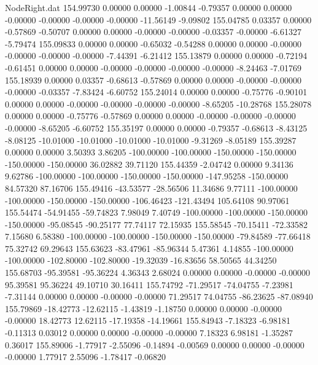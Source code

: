 \begin{filecontents}{NodeRight.dat}
 154.99730    0.00000    0.00000    -1.00844   -0.79357    0.00000    0.00000   -0.00000   -0.00000   -0.00000   -0.00000  -11.56149   -9.09802
 155.04785    0.03357    0.00000    -0.57869   -0.50707    0.00000    0.00000   -0.00000   -0.00000   -0.03357   -0.00000   -6.61327   -5.79474
 155.09833    0.00000    0.00000    -0.65032   -0.54288    0.00000    0.00000   -0.00000   -0.00000   -0.00000   -0.00000   -7.44391   -6.21412
 155.13879    0.00000    0.00000    -0.72194   -0.61451    0.00000    0.00000   -0.00000   -0.00000   -0.00000   -0.00000   -8.24463   -7.01769
 155.18939    0.00000    0.03357    -0.68613   -0.57869    0.00000    0.00000   -0.00000   -0.00000   -0.00000   -0.03357   -7.83424   -6.60752
 155.24014    0.00000    0.00000    -0.75776   -0.90101    0.00000    0.00000   -0.00000   -0.00000   -0.00000   -0.00000   -8.65205  -10.28768
 155.28078    0.00000    0.00000    -0.75776   -0.57869    0.00000    0.00000   -0.00000   -0.00000   -0.00000   -0.00000   -8.65205   -6.60752
 155.35197    0.00000    0.00000    -0.79357   -0.68613   -8.43125   -8.08125  -10.01000  -10.01000  -10.01000  -10.01000   -9.31269   -8.05189
 155.39287    0.00000    0.00000     3.50393    3.86205 -100.00000 -100.00000 -150.00000 -150.00000 -150.00000 -150.00000   36.02882   39.71120
 155.44359   -2.04742    0.00000     9.34136    9.62786 -100.00000 -100.00000 -150.00000 -150.00000 -147.95258 -150.00000   84.57320   87.16706
 155.49416  -43.53577  -28.56506    11.34686    9.77111 -100.00000 -100.00000 -150.00000 -150.00000 -106.46423 -121.43494  105.64108   90.97061
 155.54474  -54.91455  -59.74823     7.98049    7.40749 -100.00000 -100.00000 -150.00000 -150.00000  -95.08545  -90.25177   77.74117   72.15935
 155.58545  -70.15411  -72.33582     7.15680    6.58380 -100.00000 -100.00000 -150.00000 -150.00000  -79.84589  -77.66418   75.32742   69.29643
 155.63623  -83.47961  -85.96344     5.47361    4.14855 -100.00000 -100.00000 -102.80000 -102.80000  -19.32039  -16.83656   58.50565   44.34250
 155.68703  -95.39581  -95.36224     4.36343    2.68024    0.00000    0.00000   -0.00000   -0.00000   95.39581   95.36224   49.10710   30.16411
 155.74792  -71.29517  -74.04755    -7.23981   -7.31144    0.00000    0.00000   -0.00000   -0.00000   71.29517   74.04755  -86.23625  -87.08940
 155.79869  -18.42773  -12.62115    -1.43819   -1.18750    0.00000    0.00000   -0.00000   -0.00000   18.42773   12.62115  -17.19358  -14.19661
 155.84943   -7.18323   -6.98181    -0.11313    0.03012    0.00000    0.00000   -0.00000   -0.00000    7.18323    6.98181   -1.35287    0.36017
 155.89006   -1.77917   -2.55096    -0.14894   -0.00569    0.00000    0.00000   -0.00000   -0.00000    1.77917    2.55096   -1.78417   -0.06820

\end{filecontents}
